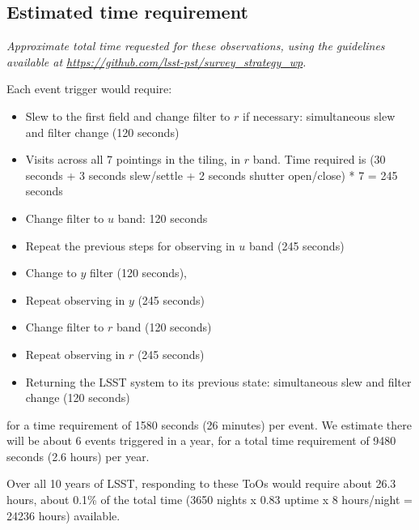 \documentclass[12pt, letterpaper]{article}
\begin{document}
\subsection{Estimated time requirement}
\begin{footnotesize}
{\it Approximate total time requested for these observations, using the guidelines available at \url{https://github.com/lsst-pst/survey_strategy_wp}.}
\end{footnotesize}

Each event trigger would require:
\begin{itemize}
\item Slew to the first field and change filter to $r$ if necessary: simultaneous slew and filter change (120 seconds) 
\item Visits across all 7 pointings in the tiling, in $r$ band. Time required is (30 seconds + 3 seconds slew/settle + 2 seconds shutter open/close) * 7 =  245 seconds
\item Change filter to $u$ band: 120 seconds 
\item Repeat the previous steps for observing in $u$ band (245 seconds)
\item Change to $y$ filter (120 seconds), 
\item Repeat observing in $y$ (245 seconds)
\item Change filter to $r$ band (120 seconds)
\item Repeat observing in $r$ (245 seconds)
\item Returning the LSST system to its previous state: simultaneous slew and filter change (120 seconds)
\end{itemize}
for a time requirement of 1580 seconds (26 minutes) per event. We estimate there will be about 6 events triggered in a year, for a total time requirement of 9480 seconds (2.6 hours) per year.

Over all 10 years of LSST, responding to these ToOs would require about 26.3 hours, about 0.1\% of the total time (3650 nights x 0.83 uptime x 8 hours/night = 24236 hours) available. 
\end{document}
